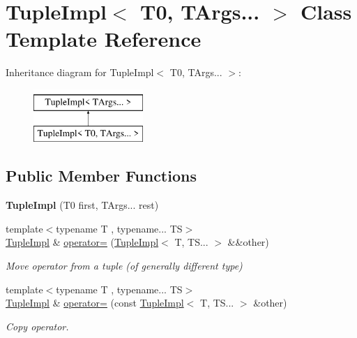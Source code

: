 \hypertarget{classTupleImpl_3_01T0_00_01TArgs_8_8_8_01_4}{}\section{Tuple\+Impl$<$ T0, T\+Args... $>$ Class Template Reference}
\label{classTupleImpl_3_01T0_00_01TArgs_8_8_8_01_4}
Inheritance diagram for Tuple\+Impl$<$ T0, T\+Args... $>$\+:\begin{figure}[H]
\begin{center}
\leavevmode
\includegraphics[height=2.000000cm]{classTupleImpl_3_01T0_00_01TArgs_8_8_8_01_4}
\end{center}
\end{figure}
\subsection*{Public Member Functions}
\begin{DoxyCompactItemize}
\item 
\hypertarget{classTupleImpl_3_01T0_00_01TArgs_8_8_8_01_4_aa84dab5d204c5544268c707b92272def}{}\label{classTupleImpl_3_01T0_00_01TArgs_8_8_8_01_4_aa84dab5d204c5544268c707b92272def} 
{\bfseries Tuple\+Impl} (T0 first, T\+Args... rest)
\item 
\hypertarget{classTupleImpl_3_01T0_00_01TArgs_8_8_8_01_4_a77116aabd53e3ace214398204ebf37f1}{}\label{classTupleImpl_3_01T0_00_01TArgs_8_8_8_01_4_a77116aabd53e3ace214398204ebf37f1} 
{\footnotesize template$<$typename T , typename... TS$>$ }\\\hyperlink{classTupleImpl}{Tuple\+Impl} \& \hyperlink{classTupleImpl_3_01T0_00_01TArgs_8_8_8_01_4_a77116aabd53e3ace214398204ebf37f1}{operator=} (\hyperlink{classTupleImpl}{Tuple\+Impl}$<$ T, T\+S... $>$ \&\&other)
\begin{DoxyCompactList}\small\item\em Move operator from a tuple (of generally different type) \end{DoxyCompactList}\item 
\hypertarget{classTupleImpl_3_01T0_00_01TArgs_8_8_8_01_4_a789f4621469a89b8611ad048f9667d30}{}\label{classTupleImpl_3_01T0_00_01TArgs_8_8_8_01_4_a789f4621469a89b8611ad048f9667d30} 
{\footnotesize template$<$typename T , typename... TS$>$ }\\\hyperlink{classTupleImpl}{Tuple\+Impl} \& \hyperlink{classTupleImpl_3_01T0_00_01TArgs_8_8_8_01_4_a789f4621469a89b8611ad048f9667d30}{operator=} (const \hyperlink{classTupleImpl}{Tuple\+Impl}$<$ T, T\+S... $>$ \&other)
\begin{DoxyCompactList}\small\item\em Copy operator. \end{DoxyCompactList}\end{DoxyCompactItemize}
